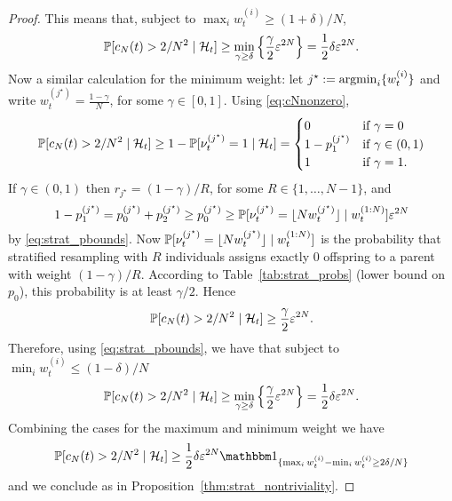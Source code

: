 \begin{proof}
This means that, subject to $\max_i w_t^{(i)} \geq (1+\delta)/N$,
\begin{equation*}
\Prob[ c_N(t) > 2/N^2 \mid \mathcal{H}_t ]
\geq \min_{\gamma \geq \delta} 
        \left\{ \frac{\gamma }{2} \varepsilon^{2N} \right\}
= \frac{1}{2} \delta \varepsilon^{2N} .
\end{equation*}
Now a similar calculation for the minimum weight:
let $j^\star := \argmin_i \{ w_t^{(i)} \}$ and write
$w_t^{(j^\star)} = \frac{1-\gamma}{N}$, for some 
$\gamma \in [0,1]$.
Using \eqref{eq:cNnonzero},
\begin{equation*}
\Prob[ c_N(t) > 2/N^2 \mid \mathcal{H}_t ]
\geq 1- \Prob[ \nu_t^{(j^\star)} =1 \mid \mathcal{H}_t ]
= \begin{cases}
    0 & \text{if } \gamma = 0 \\
    1 - p_1^{(j^\star)} & \text{if } \gamma \in (0,1) \\
    1 & \text{if } \gamma = 1 .
\end{cases}
\end{equation*}
If $\gamma \in (0,1)$ then $r_{j^\star} = (1- \gamma)/R$, for some $R\in\{1, \dots, N-1\}$, and
\begin{equation*}
1 - p_1^{(j^\star)}
= p_0^{(j^\star)} + p_2^{(j^\star)}
\geq p_0^{(j^\star)} 
\geq \Prob[ \nu_t^{(j^\star)} = \flnw[j^\star] \mid w_t^{(1:N)} ] \varepsilon^{2N} 
\end{equation*}
by \eqref{eq:strat_pbounds}.
Now $\Prob[ \nu_t^{(j^\star)} = \flnw[j^\star] \mid w_t^{(1:N)} ]$ is the probability that stratified resampling with $R$ individuals assigns exactly 0 offspring to a parent with weight $(1-\gamma) /R$. According to Table~\ref{tab:strat_probs} (lower bound on $p_0$), this probability is at least $\gamma/2$.
Hence 
\begin{equation*}
\Prob[ c_N(t) > 2/N^2 \mid \mathcal{H}_t ]
\geq \frac{\gamma}{2} \varepsilon^{2N} .
\end{equation*}
Therefore, using \eqref{eq:strat_pbounds}, we have that subject to $\min_i w_t^{(i)} \leq (1-\delta)/N$
\begin{equation*}
\Prob[ c_N(t) > 2/N^2 \mid \mathcal{H}_t ]
\geq \min_{\gamma \geq \delta} 
        \left\{ \frac{ \gamma }{2}  \varepsilon^{2N}
        \right\}
= \frac{1}{2} \delta \varepsilon^{2N} .
\end{equation*}
Combining the cases for the maximum and minimum weight we have
\begin{equation*}
\Prob[ c_N(t) > 2/N^2 \mid \mathcal{H}_t ] 
\geq \frac{1}{2} \delta \varepsilon^{2N}
        \I{ \max_i w_t^{(i)} - \min_i w_t^{(i)} \geq 2\delta/N }
\end{equation*}
and we conclude as in Proposition~\ref{thm:strat_nontriviality}.
\end{proof}




